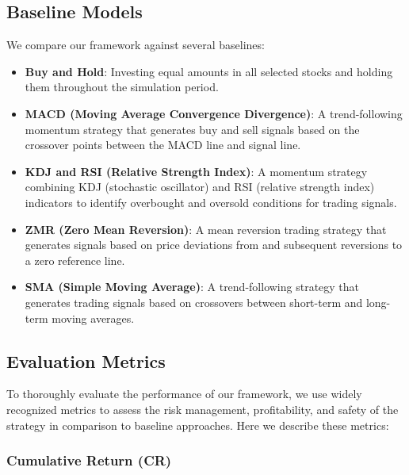 \subsection{Baseline Models}\label{appendix:baselines}

We compare our \model framework against several baselines:
\begin{itemize}

    \item \textbf{Buy and Hold}: Investing equal amounts in all selected stocks and holding them throughout the simulation period.

    \item \textbf{MACD (Moving Average Convergence Divergence)}: A trend-following momentum strategy that generates buy and sell signals based on the crossover points between the MACD line and signal line.

    \item \textbf{KDJ and RSI (Relative Strength Index)}: A momentum strategy combining KDJ (stochastic oscillator) and RSI (relative strength index) indicators to identify overbought and oversold conditions for trading signals.

    \item \textbf{ZMR (Zero Mean Reversion)}: A mean reversion trading strategy that generates signals based on price deviations from and subsequent reversions to a zero reference line.

    \item \textbf{SMA (Simple Moving Average)}: A trend-following strategy that generates trading signals based on crossovers between short-term and long-term moving averages.
\end{itemize}



\subsection{Evaluation Metrics}\label{appendix:eval_metrics}


To thoroughly evaluate the performance of our \model framework, we use widely recognized metrics to assess the risk management, profitability, and safety of the \model strategy in comparison to baseline approaches. Here we describe these metrics:

\subsubsection{Cumulative Return (CR)}


